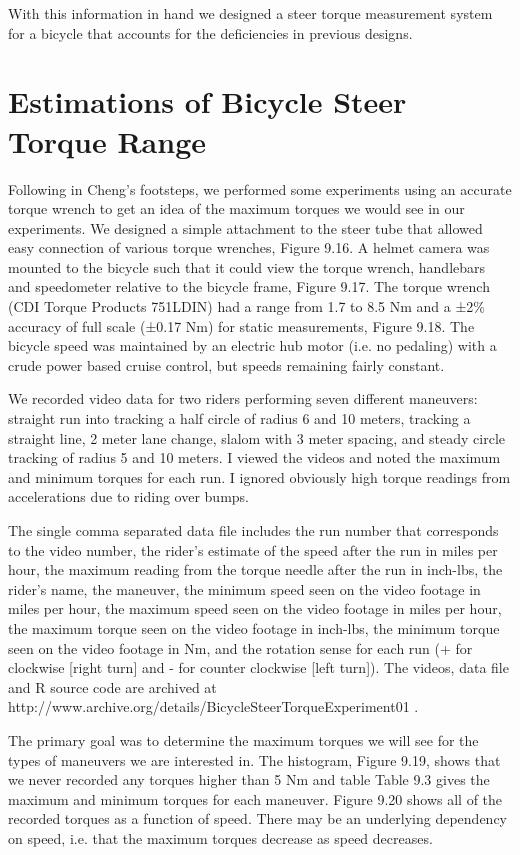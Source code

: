 \documentclass[10pt]{article}
\begin{document}

With this information in hand we designed a steer torque measurement system for
a bicycle that accounts for the deficiencies in previous designs.

\section*{Estimations of Bicycle Steer Torque Range}

Following in Cheng’s footsteps, we performed some experiments using an accurate
torque wrench to get an idea of the maximum torques we would see in our
experiments. We designed a simple attachment to the steer tube that allowed
easy connection of various torque wrenches, Figure 9.16. A helmet camera was
mounted to the bicycle such that it could view the torque wrench, handlebars
and speedometer relative to the bicycle frame, Figure 9.17. The torque wrench
(CDI Torque Products 751LDIN) had a range from 1.7 to 8.5 Nm and a ±2\%
accuracy of full scale (±0.17 Nm) for static measurements, Figure 9.18. The
bicycle speed was maintained by an electric hub motor (i.e. no pedaling) with a
crude power based cruise control, but speeds remaining fairly constant.

We recorded video data for two riders performing seven different maneuvers:
straight run into tracking a half circle of radius 6 and 10 meters, tracking a
straight line, 2 meter lane change, slalom with 3 meter spacing, and steady
circle tracking of radius 5 and 10 meters. I viewed the videos and noted the
maximum and minimum torques for each run. I ignored obviously high torque
readings from accelerations due to riding over bumps.

The single comma separated data file includes the run number that corresponds
to the video number, the rider’s estimate of the speed after the run in miles
per hour, the maximum reading from the torque needle after the run in inch-lbs,
the rider’s name, the maneuver, the minimum speed seen on the video footage in
miles per hour, the maximum speed seen on the video footage in miles per hour,
the maximum torque seen on the video footage in inch-lbs, the minimum torque
seen on the video footage in Nm, and the rotation sense for each run (+ for
clockwise [right turn] and - for counter clockwise [left turn]). The videos,
data file and R source code are archived at
http://www.archive.org/details/BicycleSteerTorqueExperiment01 .

The primary goal was to determine the maximum torques we will see for the types
of maneuvers we are interested in. The histogram, Figure 9.19, shows that we
never recorded any torques higher than 5 Nm and table Table 9.3 gives the
maximum and minimum torques for each maneuver. Figure 9.20 shows all of the
recorded torques as a function of speed. There may be an underlying dependency
on speed, i.e. that the maximum torques decrease as speed decreases.
\end{document}
